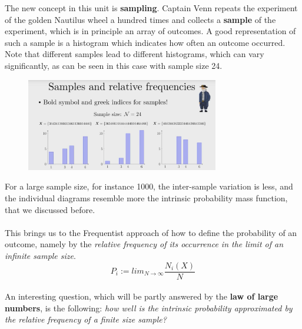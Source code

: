 \documentclass[12pt, a4paper]{scrartcl}
\begin{document}
The new concept in this unit is \textbf{sampling}.
Captain Venn repeats the experiment of the golden Nautilus wheel a hundred times and collects a \textbf{sample} of the experiment, which is in principle an array of outcomes. 
A good representation of such a sample is a histogram which indicates how often an outcome occurred.
Note that different samples lead to different histograms, which can vary significantly, as can be seen in this case with sample size 24. 
\begin{figure}[H]
	\centering
	\includegraphics[width=0.75\textwidth]{2_3.png}
\end{figure}
For a large sample size, for instance 1000, the inter-sample variation is less, and the individual diagrams resemble more the intrinsic probability mass function, that we discussed before.\\

\\

This brings us to the Frequentist approach of how to define the probability of an outcome, namely by the \textit{relative frequency of its occurrence in the limit of an infinite sample size}.\\

\begin{equation*}\boxed{P_i:= lim_{N\rightarrow \infty}\frac{N_i(X)}{N}}\end{equation*}\\
An interesting question, which will be partly answered by the \textbf{law of large numbers}, is the following: \textit{how well is the intrinsic probability approximated by the relative frequency of a finite size sample?}\\
\end{document}
